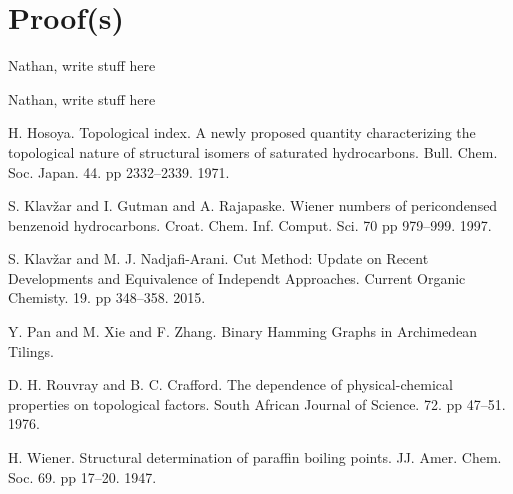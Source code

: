 \documentclass[11pt,a4paper]{article}
\begin{document}
\section{Proof(s)} \label{sec:proof}

Nathan, write stuff here

Nathan, write stuff here

%
%
%
%
%
%
%



\begin{thebibliography}{10}
 H. Hosoya. Topological index. A newly proposed quantity characterizing the topological nature of structural isomers of saturated hydrocarbons. Bull. Chem. Soc. Japan. 44. pp 2332--2339. 1971.

 S. Klav\v{z}ar and I. Gutman and A. Rajapaske. Wiener numbers of pericondensed benzenoid hydrocarbons. Croat. Chem. Inf. Comput. Sci. 70 pp 979--999. 1997.

 S. Klav\v{z}ar and M. J. Nadjafi-Arani. Cut Method: Update on Recent Developments and Equivalence of Independt Approaches. Current Organic Chemisty. 19. pp 348--358. 2015.

 Y. Pan and M. Xie and F. Zhang. Binary Hamming Graphs in Archimedean Tilings. 

 D. H. Rouvray and B. C. Crafford. The dependence of physical-chemical properties on topological factors. South African Journal of Science. 72. pp 47--51. 1976.

 H. Wiener. Structural determination of paraffin boiling points. JJ. Amer. Chem. Soc. 69. pp 17--20. 1947.
\end{thebibliography}
\end{document}
